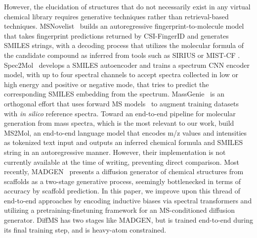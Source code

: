 \documentclass{article}
\theoremstyle{plain}
\theoremstyle{definition}
\theoremstyle{remark}
\newcommand{\ours}{DiffMS\xspace}
\begin{document}
However, the elucidation of structures that do not necessarily exist in any virtual chemical library requires generative techniques rather than retrieval-based techniques. MSNovelist~\citep{stravs2022msnovelist} builds an autoregressive fingerprint-to-molecule model that takes fingerprint predictions returned by CSI-FingerID and generates SMILES strings, with a decoding process that utilizes the molecular formula of the candidate compound as inferred from tools such as SIRIUS\cite{bocker2016fragmentation} or MIST-CF \cite{goldman2023mist-cf}. %
Spec2Mol~\citep{litsa2023spec2mol} develops a SMILES autoencoder and trains a spectrum CNN encoder model, with up to four spectral channels to accept spectra collected in low or high energy and positive or negative mode, that tries to predict the corresponding SMILES embedding from the spectrum. %
MassGenie~\citep{shrivastava2021massgenie} is an orthogonal effort that uses forward MS models~\citep{allen2015cfm-id,goldman2024iceberg} to augment training datasets with \emph{in silico} reference spectra.
Toward an end-to-end pipeline for molecular generation from mass spectra, which is the most relevant to our work, \citet{butler2023ms2mol} build MS2Mol, an end-to-end language model that encodes m/z values and intensities as tokenized text input and outputs an inferred chemical formula and SMILES string in an autoregressive manner. However, their implementation is not currently available at the time of writing, preventing direct comparison. Most recently, MADGEN~\citep{wang2025madgenmassspecattendsnovo} presents a diffusion generator of chemical structures from scaffolds as a two-stage generative process, seemingly bottlenecked in terms of accuracy by scaffold prediction. 
In this paper, we improve upon this thread of end-to-end approaches by encoding inductive biases via spectral transformers and utilizing a pretraining-finetuning framework for an MS-conditioned diffusion generator. \ours has two stages like MADGEN, but is trained end-to-end during its final training step, and is heavy-atom constrained.

\end{document}
